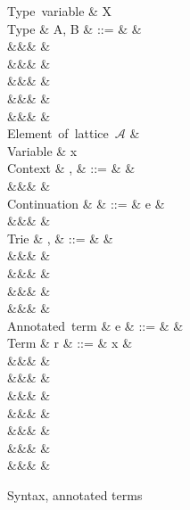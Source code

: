 \begin{figure}[H]
\begin{syntaxfig}
\mbox{Type variable}
&
X
\\[2mm]
\mbox{Type}
&
A, B
&
::=
&
&
\\
&&&
\tyUnit
&
\\
&&&
&
\\
&&&
&
\\
&&&
&
\\
&&&
&
\\[2mm]
\mbox{Element of lattice $\mathcal{A}$}
&
\alpha
\\[2mm]
\mbox{Variable}
&
x
\\[2mm]
\mbox{Context}
&
\Gamma, \Delta
&
::=
&
\cxtEmpty
&
\\
&&&
&
\\[2mm]
\mbox{Continuation}
&
\kappa
&
::=
&
e
&
\\
&&&
\sigma
&
\\[2mm]
\mbox{Trie}
&
\sigma, \tau
&
::=
&
&
\\
&&&
\trieUnit{\kappa}
&
\\
&&&
&
\\
&&&
\trieProd{\sigma}
&
\\
&&&
\trieRoll{\sigma}
&
\\[2mm]
\mbox{Annotated term}
&
e
&
::=
&
&
\\[2mm]
\mbox{Term}
&
r
&
::=
&
x
&
\\
&&&
\exUnit
&
\\
&&&
&
\\
&&&
&
\\
&&&
&
\\
&&&
\exFun{\sigma}
&
\\
&&&
&
\\
&&&
&
\end{syntaxfig}
\caption{Syntax, annotated terms}
\label{fig:demand-indexed:syntax}
\end{figure}
